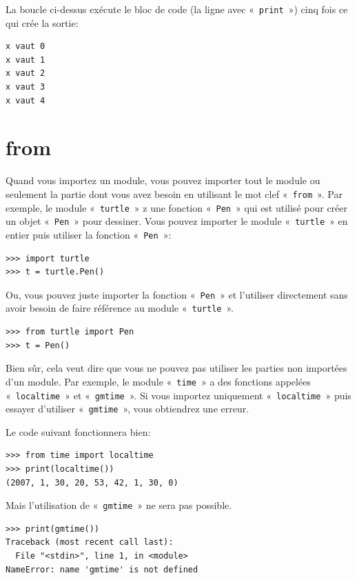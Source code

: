 La boucle ci-dessus exécute le bloc de code (la ligne avec « \texttt{print} ») cinq fois ce qui crée la sortie:
\begin{Verbatim}[frame=single,rulecolor=\color{gray}]
x vaut 0
x vaut 1
x vaut 2
x vaut 3
x vaut 4
\end{Verbatim}

\section*{from}
Quand vous importez un module, vous pouvez importer tout le module ou seulement la partie dont vous avez besoin en utilisant le mot clef « \texttt{from} ». Par exemple, le module « \texttt{turtle} » z une fonction  « \texttt{Pen} » qui est utilisé pour créer un objet « \texttt{Pen} » pour dessiner. Vous pouvez importer le module « \texttt{turtle} » en entier puis utiliser la fonction « \texttt{Pen} »:

\begin{Verbatim}[frame=single,rulecolor=\color{gray}]
>>> import turtle
>>> t = turtle.Pen()
\end{Verbatim}

Ou, vous pouvez juste importer la fonction « \texttt{Pen} » et l'utiliser directement sans avoir besoin de faire référence au module « \texttt{turtle} ».

\begin{Verbatim}[frame=single,rulecolor=\color{gray}]
>>> from turtle import Pen
>>> t = Pen()
\end{Verbatim}

Bien sûr, cela veut dire que vous ne pouvez pas utiliser les parties non importées d'un module. Par exemple, le module « \texttt{time} » a des fonctions appelées « \texttt{localtime} » et « \texttt{gmtime} ». Si vous importez uniquement « \texttt{localtime} » puis essayer d'utiliser « \texttt{gmtime} », vous obtiendrez une erreur.

Le code suivant fonctionnera bien:
\begin{Verbatim}[frame=single,rulecolor=\color{gray}]
>>> from time import localtime
>>> print(localtime())
(2007, 1, 30, 20, 53, 42, 1, 30, 0)
\end{Verbatim}

Mais l'utilisation de « \texttt{gmtime} » ne sera pas possible. 
\begin{Verbatim}[frame=single,rulecolor=\color{gray}]
>>> print(gmtime())
Traceback (most recent call last):
  File "<stdin>", line 1, in <module>
NameError: name 'gmtime' is not defined
\end{Verbatim}

